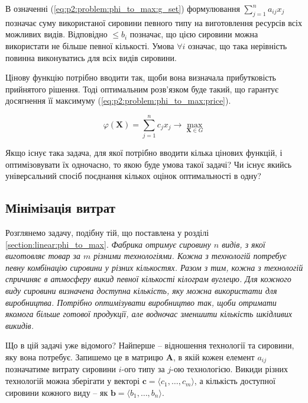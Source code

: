 \documentclass[\main/book.tex]{subfiles}
\begin{document}
В означенні (\ref{eq:p2:problem:phi_to_max:g_set}) фор\-му\-лю\-ва\-ння ${\sum_{j=1}^n a_{ij} x_j}$ позначає суму використаної сировини певного типу на виготовлення ресурсів всіх можливих видів. Відповідно \flqq{}$\leq b_i$\frqq{} позначає, що цією сировини можна використати не більше певної кількості. Умова $\forall i$ означає, що така нерівність повинна виконуватись для всіх видів сировини.

Цінову функцію потрібно вводити так, щоби вона визначала прибутковість прийнятого рішення. Тоді оптимальним розв'язком буде такий, що гарантує досягнення її максимуму (\ref{eq:p2:problem:phi_to_max:price}).

\begin{equation}
 \varphi(\mathbf{X}) =
 \sum_{j=1}^n c_j x_j \rightarrow
 \max_{\mathbf{X} \in G}
 \label{eq:p2:problem:phi_to_max:price}
\end{equation}

\begin{question}
 Якщо існує така задача, для якої потрібно вводити кілька цінових функцій, і оптимізовувати їх одночасно, то якою буде умова такої задачі? Чи існує якийсь універсальний спосіб поєднання кількох оцінок оптимальності в одну?
\end{question}

\subsection{Мінімізація витрат}

Розглянемо задачу, подібну тій, що поставлена у розділі \ref{section:linear:phi_to_max}. \textit{Фабрика отримує сировину $n$ видів, з якої виготовляє товар за $m$ різними тех\-но\-ло\-гі\-я\-ми. Кожна з технологій потребує певну комбінацію сировини у різних кількостях. Разом з тим, кожна з технологій спричиняє в атмосферу викид певної кількості кілограм вуглецю. Для кожного виду сировини визначена доступна кількість, яку можна використати для виробництва. Потрібно оптимізувати виробництво так, щоби отримати якомога більше готової продукції, але водночас зменшити кількість шкідливих викидів.}

Що в цій задачі уже відомого? Найперше -- відношення технології та сировини, яку вона потребує. Запишемо це в матрицю $\mathbf{A}$, в якій кожен елемент $a_{ij}$ позначатиме витрату сировини $i$-ого типу за $j$-ою технологією. Викиди різних технологій можна зберігати у векторі $\mathbf{c} = \langle c_1, \ldots, c_m \rangle$, а кількість доступної сировини кожного виду -- як $\mathbf{b} = \langle b_1, \ldots, b_n \rangle$.
\end{document}
